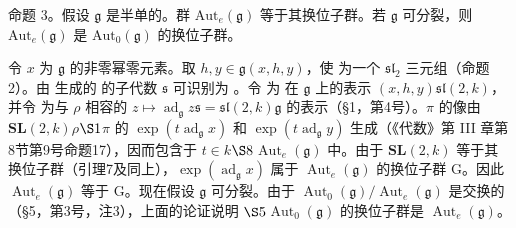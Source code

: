 命题 3。假设 \(\mathfrak{g}\) 是半单的。群 \(\mathrm{Aut}_e(\mathfrak{g})\) 等于其换位子群。若 \(\mathfrak{g}\) 可分裂，则 \(\mathrm{Aut}_e(\mathfrak{g})\) 是 \(\mathrm{Aut}_0(\mathfrak{g})\) 的换位子群。

令 \(x\) 为 \(\mathfrak{g}\) 的非零幂零元素。取 \(h, y \in \mathfrak{g}\)\((x, h, y)\)，使  为一个 \(\mathfrak{sl}_2\) 三元组（命题2）。由  生成的  的子代数 \(\mathfrak{s}\) 可识别为 。令  为  在 \(\mathfrak{g}\) 上的表示 \((x, h, y)\)\(\mathfrak{sl}(2, k)\)，并令  为与 \(\rho\) 相容的 \(z \mapsto \operatorname{ad}_{\mathfrak{g}} z\)\(\mathfrak{s} = \mathfrak{sl}(2, k)\)\(\mathfrak{g}\) 的表示（§1，第4号）。\(\pi\) 的像由 \(\mathbf{SL}(2, k)\)\(\rho\)\(\S 1\)\(\pi\) 的 \(\exp(t\operatorname{ad}_{\mathfrak{g}} x)\) 和 \(\exp(t\operatorname{ad}_{\mathfrak{g}} y)\) 生成（《代数》第 III 章第8节第9号命题17），因而包含于 \(t \in k\)\(\S 8\)\(\operatorname{Aut}_e(\mathfrak{g})\) 中。由于 \(\mathbf{SL}(2, k)\) 等于其换位子群（引理7及同上），\(\exp(\operatorname{ad}_{\mathfrak{g}} x)\) 属于 \(\operatorname{Aut}_e(\mathfrak{g})\) 的换位子群 G。因此 \(\operatorname{Aut}_e(\mathfrak{g})\) 等于 G。现在假设 \(\mathfrak{g}\) 可分裂。由于 \(\operatorname{Aut}_0(\mathfrak{g}) / \operatorname{Aut}_e(\mathfrak{g})\) 是交换的（§5，第3号，注3），上面的论证说明 \(\S 5\)\(\operatorname{Aut}_0(\mathfrak{g})\) 的换位子群是 \(\operatorname{Aut}_e(\mathfrak{g})\)。

